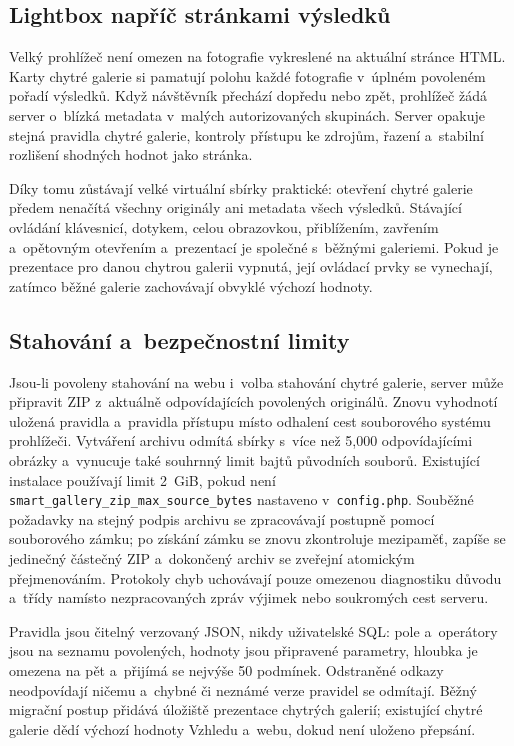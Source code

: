 \documentclass[11pt,a4paper]{article}
\begin{document}
\subsection{Lightbox napříč stránkami výsledků}

Velký prohlížeč není omezen na fotografie vykreslené na aktuální stránce HTML.
Karty chytré galerie si pamatují polohu každé fotografie v~úplném povoleném
pořadí výsledků. Když návštěvník přechází dopředu nebo zpět, prohlížeč žádá
server o~blízká metadata v~malých autorizovaných skupinách. Server opakuje
stejná pravidla chytré galerie, kontroly přístupu ke zdrojům, řazení a~stabilní
rozlišení shodných hodnot jako stránka.

Díky tomu zůstávají velké virtuální sbírky praktické: otevření chytré galerie
předem nenačítá všechny originály ani metadata všech výsledků. Stávající
ovládání klávesnicí, dotykem, celou obrazovkou, přiblížením, zavřením
a~opětovným otevřením a~prezentací je společné s~běžnými galeriemi. Pokud je
prezentace pro danou chytrou galerii vypnutá, její ovládací prvky se vynechají,
zatímco běžné galerie zachovávají obvyklé výchozí hodnoty.

\subsection{Stahování a~bezpečnostní limity}

Jsou-li povoleny stahování na webu i~volba stahování chytré galerie, server může
připravit ZIP z~aktuálně odpovídajících povolených originálů. Znovu vyhodnotí
uložená pravidla a~pravidla přístupu místo odhalení cest souborového systému
prohlížeči. Vytváření archivu odmítá sbírky s~více než 5,000 odpovídajícími
obrázky a~vynucuje také souhrnný limit bajtů původních souborů. Existující
instalace používají limit 2~GiB, pokud není
\texttt{smart\_gallery\_zip\_max\_source\_bytes} nastaveno
v~\texttt{config.php}. Souběžné požadavky na stejný podpis archivu se
zpracovávají postupně pomocí souborového zámku; po získání zámku se znovu
zkontroluje mezipaměť, zapíše se jedinečný částečný ZIP a~dokončený archiv se
zveřejní atomickým přejmenováním. Protokoly chyb uchovávají pouze omezenou
diagnostiku důvodu a~třídy namísto nezpracovaných zpráv výjimek nebo soukromých
cest serveru.

Pravidla jsou čitelný verzovaný JSON, nikdy uživatelské SQL: pole a~operátory
jsou na seznamu povolených, hodnoty jsou připravené parametry, hloubka je
omezena na pět a~přijímá se nejvýše 50 podmínek. Odstraněné odkazy neodpovídají
ničemu a~chybné či neznámé verze pravidel se odmítají. Běžný migrační postup
přidává úložiště prezentace chytrých galerií; existující chytré galerie dědí
výchozí hodnoty Vzhledu a~webu, dokud není uloženo přepsání.
\end{document}
